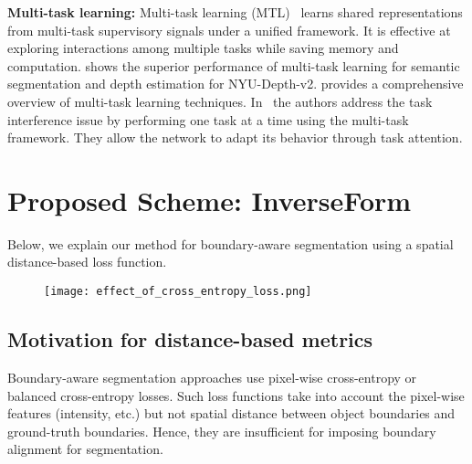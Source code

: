 \documentclass[final]{cvpr}
\begin{document}
\textbf{Multi-task learning:} Multi-task learning (MTL)~\cite{kokkinos2016ubernet} learns shared representations from multi-task supervisory signals under a unified framework. It is effective at exploring interactions among multiple tasks while saving memory and computation. \cite{vandenhende2020mti} shows the superior performance of multi-task learning for semantic segmentation and depth estimation for NYU-Depth-v2. \cite{vandenhende2020multitask} provides a comprehensive overview of multi-task learning techniques. In~\cite{maninis2019attentive} the authors address the task interference issue by performing one task at a time using the multi-task framework. They allow the network to adapt its behavior through task attention.

\section{Proposed Scheme: InverseForm}
Below, we explain our method for boundary-aware segmentation using a spatial distance-based loss function.

\begin{figure}[t]
    \centering
     \texttt{[image: effect\_of\_cross\_entropy\_loss.png]}
  \label{fig: affine_transform}
\end{figure}

\subsection{Motivation for distance-based metrics}

Boundary-aware segmentation approaches use pixel-wise cross-entropy or balanced cross-entropy losses. Such loss functions take into account the pixel-wise features (intensity, etc.) but not spatial distance between object boundaries and ground-truth boundaries. Hence, they are insufficient for imposing boundary alignment for segmentation. 
\end{document}
